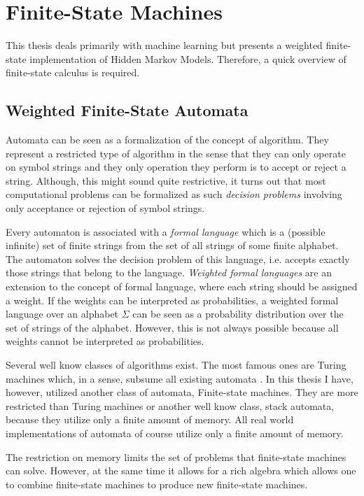 \chapter{Finite-State Machines}

This thesis deals primarily with machine learning but
\cite{Silfverberg2011} presents a weighted finite-state implementation
of Hidden Markov Models. Therefore, a quick overview of finite-state
calculus is required.

\section{Weighted Finite-State Automata}

Automata can be seen as a formalization of the concept of
algorithm. They represent a restricted type of algorithm in the sense
that they can only operate on symbol strings and they only operation
they perform is to accept or reject a string. Although, this might
sound quite restrictive, it turns out that most computational problems
can be formalized as such {\it decision problems} involving only
acceptance or rejection of symbol strings.

Every automaton is associated with a {\it formal language} which is a
(possible infinite) set of finite strings from the set of all strings
of some finite alphabet. The automaton solves the decision problem of
this language, i.e. accepts exactly those strings that belong to the
language. {\it Weighted formal languages} are an extension to the
concept of formal language, where each string should be assigned a
weight. If the weights can be interpreted as probabilities, a weighted
formal language over an alphabet $\Sigma$ can be seen as a probability
distribution over the set of strings of the alphabet. However, this is
not always possible because all weights cannot be interpreted as
probabilities.

Several well know classes of algorithms exist. The most famous ones
are Turing machines which, in a sense, subsume all existing automata
\cite{?}. In this thesis I have, however, utilized another class of
automata, Finite-state machines. They are more restricted than Turing
machines or another well know class, stack automata, because they
utilize only a finite amount of memory. All real world implementations
of automata of course utilize only a finite amount of memory.

The restriction on memory limits the set of problems that finite-state
machines can solve. However, at the same time it allows for a rich
algebra which allows one to combine finite-state machines to produce
new finite-state machines.

